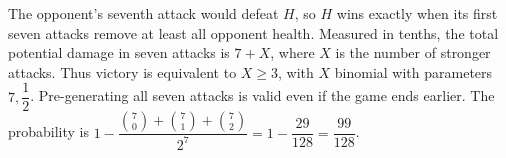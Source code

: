 The opponent's seventh attack would defeat $H$, so $H$ wins exactly when its first seven attacks remove at least all opponent health. Measured in tenths, the total potential damage in seven attacks is $7+X$, where $X$ is the number of stronger attacks. Thus victory is equivalent to $X\ge3$, with $X$ binomial with parameters $7,\dfrac{1}{2}$. Pre-generating all seven attacks is valid even if the game ends earlier. The probability is $1-\dfrac{\binom70+\binom71+\binom72}{2^7}=1-\dfrac{29}{128}=\boxed{\dfrac{99}{128}}$.
